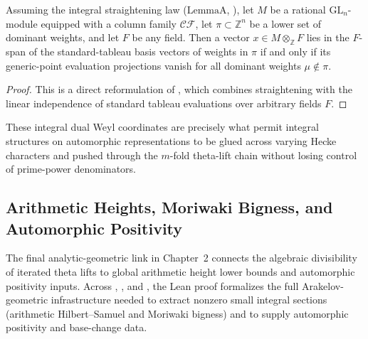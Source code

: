 \begin{theorem}
\label{thm:ch02-filtration-criterion}
Assuming the integral straightening law ($\mathrm{LemmaA}$,
),
let $M$ be a rational $\mathrm{GL}_n$-module equipped with a column family
$\mathcal{CF}$, let $\pi \subset \mathbb{Z}^n$ be a lower set of dominant
weights, and let $F$ be any field.
Then a vector $x \in M \otimes_{\mathbb{Z}} F$ lies in the $F$-span of the
standard-tableau basis vectors of weights in $\pi$ if and only if its
generic-point evaluation projections vanish for all dominant weights
$\mu \notin \pi$.
\end{theorem}

\begin{proof}
This is a direct reformulation of
,
which combines straightening with the linear independence of standard tableau
evaluations over arbitrary fields $F$.
\end{proof}

These integral dual Weyl coordinates are precisely what permit integral
structures on automorphic representations to be glued across varying Hecke
characters and pushed through the $m$-fold theta-lift chain without losing
control of prime-power denominators.

\subsection{Arithmetic Heights, Moriwaki Bigness, and Automorphic Positivity}
\label{subsec:ch02-heights-positivity}

The final analytic-geometric link in Chapter~2 connects the algebraic
divisibility of iterated theta lifts to global arithmetic height lower bounds
and automorphic positivity inputs.
Across ,
, and , the
Lean proof formalizes the full Arakelov-geometric infrastructure needed to
extract nonzero small integral sections (arithmetic Hilbert--Samuel and
Moriwaki bigness) and to supply automorphic positivity and base-change data.

